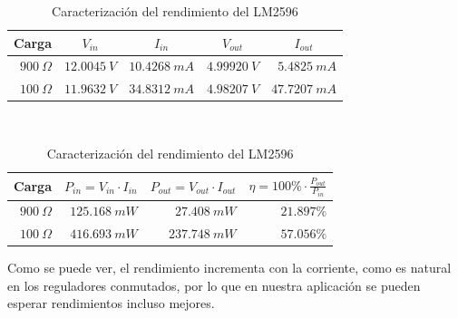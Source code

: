 \begin{table}[H]
    \centering
    \begin{subtable}[t]{\textwidth}
        \centering
        \begin{tabular}{rrrrr}
            \toprule
            \multicolumn{1}{c}{Carga} & \multicolumn{1}{c}{$V_{in}$} & \multicolumn{1}{c}{$I_{in}$} & \multicolumn{1}{c}{$V_{out}$} & \multicolumn{1}{c}{$I_{out}$}\\ \midrule
            $900\ \Omega$             & $12.0045\ V$                 & $10.4268\ mA$                & $4.99920\ V$                  & $5.4825\ mA$                \\
            $100\ \Omega$             & $11.9632\ V$                 & $34.8312\ mA$                & $4.98207\ V$                  & $47.7207\ mA$                \\ \bottomrule
        \end{tabular}
        \caption{Medidas tomadas en laboratorio}
    \end{subtable}
    \\[0.5cm]
    \begin{subtable}[t]{\textwidth}
        \centering
        \begin{tabular}{rrrr}
            \toprule
            \multicolumn{1}{c}{Carga} & \multicolumn{1}{l}{$P_{in} = V_{in}\cdot I_{in}$} & \multicolumn{1}{l}{$P_{out} = V_{out}\cdot I_{out}$} & \multicolumn{1}{l}{$\eta = 100\%\cdot\frac{P_{out}}{P_{in}}$} \\ \midrule
            $900\ \Omega$             & $125. 168\ mW$                                    & $27.408\ mW$                                         & $21.897\%$                                                    \\
            $100\ \Omega$             & $416.693\ mW$                                     & $237.748\ mW$                                        & $57.056\%$                                                    \\ \bottomrule
        \end{tabular}
        \caption{Cálculos de rendimiento realizados}
    \end{subtable}
    \caption{Caracterización del rendimiento del LM2596}
    \label{tab:rendimiento_reductor}
\end{table}

Como se puede ver, el rendimiento incrementa con la corriente, como es natural en los reguladores conmutados, por lo que en nuestra aplicación se pueden esperar rendimientos incluso mejores.